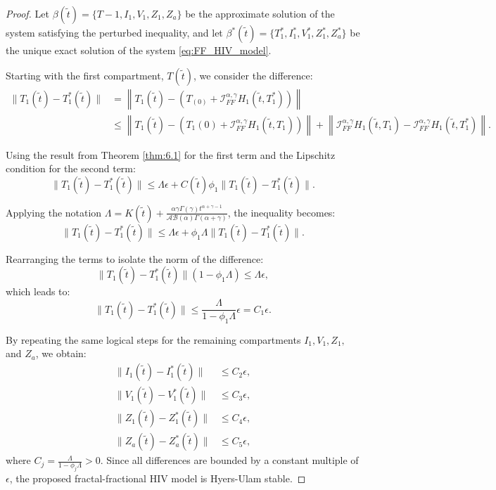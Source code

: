 \documentclass{article}
\theoremstyle{plain}
\theoremstyle{definition}
\numberwithin{equation}{section}
\begin{document}
\begin{proof}
	Let $\beta(\tilde{t}) = \{T-1, I_1, V_1, Z_1, Z_a\}$ be the approximate solution of the system satisfying the perturbed inequality, and let $\beta^*(\tilde{t}) = \{T_1^*, I_1^*, V_1^*, Z_1^*, Z_a^*\}$ be the unique exact solution of the system \eqref{eq:FF_HIV_model}.
	
	Starting with the first compartment, $T(\tilde{t})$, we consider the difference:
	\begin{align*}
		\|T_1(\tilde{t}) - T_1^*(\tilde{t})\| &= \left\| T_1(\tilde{t}) - \left( T_(0) + \mathcal{I}_{FF}^{\alpha, \gamma} H_1(\tilde{t}, T_1^*) \right) \right\| \\
		&\leq \left\| T_1(\tilde{t}) - \left( T_1(0) + \mathcal{I}_{FF}^{\alpha, \gamma} H_1(\tilde{t}, T_1) \right) \right\| + \left\| \mathcal{I}_{FF}^{\alpha, \gamma} H_1(\tilde{t}, T_1) - \mathcal{I}_{FF}^{\alpha, \gamma} H_1(\tilde{t}, T_1^*) \right\|.
	\end{align*}
	
	Using the result from Theorem \ref{thm:6.1} for the first term and the Lipschitz condition for the second term:
	\begin{equation*}
		\|T_1(\tilde{t}) - T_1^*(\tilde{t})\| \leq \Lambda \epsilon + C(\tilde{t}) \phi_1 \|T_1(\tilde{t}) - T_1^*(\tilde{t})\|.
	\end{equation*}
	
	Applying the notation $\Lambda = K(\tilde{t}) + \frac{\alpha\gamma \Gamma(\gamma) t^{\alpha+\gamma-1}}{\mathcal{AB(\alpha)}\Gamma(\alpha+\gamma)}$, the inequality becomes:
	\begin{equation*}
		\|T_1(\tilde{t}) - T_1^*(\tilde{t})\| \leq \Lambda \epsilon + \phi_1 \Lambda \|T_1(\tilde{t}) - T_1^*(\tilde{t})\|.
	\end{equation*}
	
	Rearranging the terms to isolate the norm of the difference:
	\begin{equation*}
		\|T_1(\tilde{t}) - T_1^*(\tilde{t})\| (1 - \phi_1 \Lambda) \leq \Lambda \epsilon,
	\end{equation*}
	which leads to:
	\begin{equation}
		\|T_1(\tilde{t}) - T_1^*(\tilde{t})\| \leq \frac{\Lambda}{1 - \phi_1 \Lambda} \epsilon = C_1 \epsilon.
	\end{equation}
	
	By repeating the same logical steps for the remaining compartments $I_1, V_1, Z_1,$ and $Z_a$, we obtain:
	\begin{align*}
		\|I_1(\tilde{t}) - I_1^*(\tilde{t})\| &\leq C_2 \epsilon, \\
		\|V_1(\tilde{t}) - V_1^*(\tilde{t})\| &\leq C_3 \epsilon, \\
		\|Z_1(\tilde{t}) - Z_1^*(\tilde{t})\| &\leq C_4 \epsilon, \\
		\|Z_{a}(\tilde{t}) - Z_a^*(\tilde{t})\| &\leq C_5 \epsilon,
	\end{align*}
	where $C_j = \frac{\Lambda}{1 - \phi_j \Lambda} > 0$. Since all differences are bounded by a constant multiple of $\epsilon$, the proposed fractal-fractional HIV model is Hyers-Ulam stable.
\end{proof}
\end{document}
